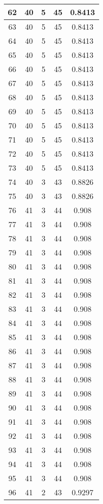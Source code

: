 \documentclass[letterpaper, 12pt]{article}
\begin{document}
\begin{longtable}{|c|c|c|c|c|}
\hline
62 & 40 & 5 & 45 & 0.8413 \\
\hline
63 & 40 & 5 & 45 & 0.8413 \\
\hline
64 & 40 & 5 & 45 & 0.8413 \\
\hline
65 & 40 & 5 & 45 & 0.8413 \\
\hline
66 & 40 & 5 & 45 & 0.8413 \\
\hline
67 & 40 & 5 & 45 & 0.8413 \\
\hline
68 & 40 & 5 & 45 & 0.8413 \\
\hline
69 & 40 & 5 & 45 & 0.8413 \\
\hline
70 & 40 & 5 & 45 & 0.8413 \\
\hline
71 & 40 & 5 & 45 & 0.8413 \\
\hline
72 & 40 & 5 & 45 & 0.8413 \\
\hline
73 & 40 & 5 & 45 & 0.8413 \\
\hline
74 & 40 & 3 & 43 & 0.8826 \\
\hline
75 & 40 & 3 & 43 & 0.8826 \\
\hline
76 & 41 & 3 & 44 & 0.908 \\
\hline
77 & 41 & 3 & 44 & 0.908 \\
\hline
78 & 41 & 3 & 44 & 0.908 \\
\hline
79 & 41 & 3 & 44 & 0.908 \\
\hline
80 & 41 & 3 & 44 & 0.908 \\
\hline
81 & 41 & 3 & 44 & 0.908 \\
\hline
82 & 41 & 3 & 44 & 0.908 \\
\hline
83 & 41 & 3 & 44 & 0.908 \\
\hline
84 & 41 & 3 & 44 & 0.908 \\
\hline
85 & 41 & 3 & 44 & 0.908 \\
\hline
86 & 41 & 3 & 44 & 0.908 \\
\hline
87 & 41 & 3 & 44 & 0.908 \\
\hline
88 & 41 & 3 & 44 & 0.908 \\
\hline
89 & 41 & 3 & 44 & 0.908 \\
\hline
90 & 41 & 3 & 44 & 0.908 \\
\hline
91 & 41 & 3 & 44 & 0.908 \\
\hline
92 & 41 & 3 & 44 & 0.908 \\
\hline
93 & 41 & 3 & 44 & 0.908 \\
\hline
94 & 41 & 3 & 44 & 0.908 \\
\hline
95 & 41 & 3 & 44 & 0.908 \\
\hline
96 & 41 & 2 & 43 & 0.9297 \\

\end{longtable}
\end{document}
